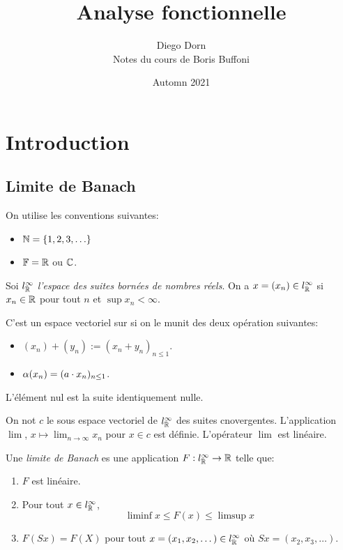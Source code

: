 \newcommand{\lang}{francais}



\title{Analyse fonctionnelle}
\author{Diego Dorn \\ Notes du cours de Boris Buffoni}
\date{Automn 2021}

\newcommand{\linfR}{l^\infty_\R}


    \maketitle

    \section{Introduction}
    \subsection{Limite de Banach}

    On utilise les conventions suivantes:
    \begin{itemize}
        \item $\N = \set{1, 2, 3, \dots}$
        \item $\mathbb F = \mathbb R$ ou $\mathbb C$.
    \end{itemize}

    \begin{definition}
        Soi $\linfR$ \emph{l'espace des suites bornées de nombres réels}.
        On a $ x = (x_n) \in \linfR$
            si $x_n \in \mathbb R$ pour tout $n$ 
        et $\sup x_n < \infty$.

        C'est un espace vectoriel sur \R si on le munit des deux opération suivantes:
        \begin{itemize}
            \item $(x_n) + (y_n) := (x_n + y_n)_{n \leq 1}$.
            \item $\alpha (x_n) = (a \cdot x_n)_{n \leq 1}$.
        \end{itemize}
        L'élément nul est la suite identiquement nulle.
    \end{definition}

    On not $c$ le sous espace vectoriel de $\linfR$ des suites cnovergentes.
    L'application $\lim$, $x \mapsto \lim_{n\to\infty} x_n$ 
    pour $x \in c$ est définie.
    L'opérateur $\lim$ est linéaire.

    \begin{definition}
        Une \emph{limite de Banach} es une application
        $F: \linfR \to \R$ telle que:
        \begin{enumerate}
            \item $F$ est linéaire.
            \item Pour tout $x \in \linfR$,
            \[
                \liminf x \leq F(x) \leq \limsup x
            \]
            \item $F(Sx) = F(X)$ pour tout $x = (x_1, x_2, \dots) \in \linfR$
                où $Sx = (x_2, x_3, \dots)$.
        \end{enumerate}
    \end{definition}

